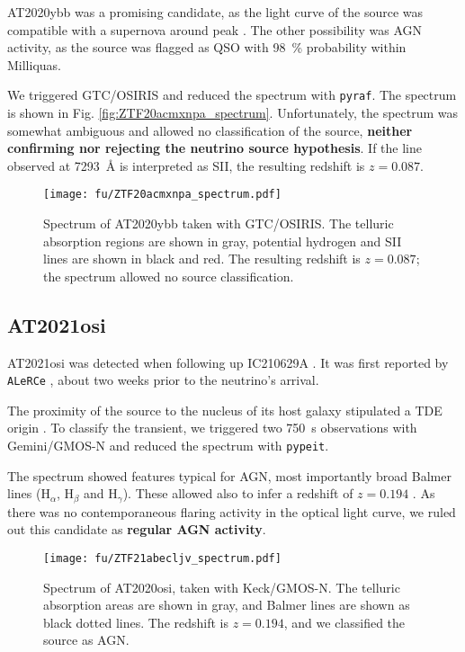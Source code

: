 AT2020ybb was a promising candidate, as the light curve of the source was compatible with a supernova around peak . The other possibility was AGN activity, as the source was flagged as QSO with \SI{98}{\percent} probability within Milliquas.

We triggered GTC/OSIRIS and reduced the spectrum with \texttt{pyraf}. The spectrum is shown in Fig. \ref{fig:ZTF20acmxnpa_spectrum}. Unfortunately, the spectrum was somewhat ambiguous and allowed no classification of the source, \textbf{neither confirming nor rejecting the neutrino source hypothesis}. If the line observed at \SI{7293}{\angstrom} is interpreted as SII, the resulting redshift is $z=0.087$.

\begin{figure}[htb]
    \texttt{[image: fu/ZTF20acmxnpa\_spectrum.pdf]}
    \caption[AT2020ybb spectrum]{Spectrum of AT2020ybb taken with GTC/OSIRIS. The telluric absorption regions are shown in gray, potential hydrogen and SII lines are shown in black and red. The resulting redshift is $z=0.087$; the spectrum allowed no source classification.}
\end{figure}

\subsection{AT2021osi}
AT2021osi was detected when following up IC210629A . It was first reported by \texttt{ALeRCe} , about two weeks prior to the neutrino's arrival. 

The proximity of the source to the nucleus of its host galaxy stipulated a TDE origin . To classify the transient, we triggered two \SI{750}{\second} observations with Gemini/GMOS-N and reduced the spectrum with \texttt{pypeit}.

The spectrum showed features typical for AGN, most importantly broad Balmer lines ($\text{H}_\alpha$, $\text{H}_\beta$ and $\text{H}_\gamma$). These allowed also to infer a redshift of $z=0.194$ . As there was no contemporaneous flaring activity in the optical light curve, we ruled out this candidate as \textbf{regular AGN activity}.

\begin{figure}[htb]
    \texttt{[image: fu/ZTF21abecljv\_spectrum.pdf]}
    \caption[AT2020osi spectrum]{Spectrum of AT2020osi, taken with Keck/GMOS-N. The telluric absorption areas are shown in gray, and Balmer lines are shown as black dotted lines. The redshift is $z= 0.194$, and we classified the source as AGN.}
\end{figure}



